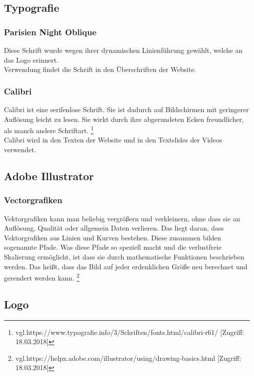 \subsection{Typografie}
\subsubsection{Parisien Night Oblique}
Diese Schrift wurde wegen ihrer dynamischen Linienführung gewählt, welche an das Logo erinnert.
\\
Verwendung findet die Schrift in den Überschriften der Website.

\subsubsection{Calibri}
Calibri ist eine serifenlose Schrift. Sie ist dadurch auf Bildschirmen mit geringerer Auflösung leicht zu lesen. Sie wirkt durch ihre abgerundeten Ecken freundlicher, als manch andere Schriftart. \footnote{\label{} vgl.https://www.typografie.info/3/Schriften/fonts.html/calibri-r61/ [Zugriff: 18.03.2018]}
\\
Calibri wird in den Texten der Website und in den Textslides der Videos verwendet.

\subsection{Adobe Illustrator}
\subsubsection{Vectorgrafiken}
Vektorgrafiken kann man beliebig vergrößern und verkleinern, ohne dass sie an Auflösung, Qualität oder allgemein Daten verlieren. Das liegt daran, dass Vektorgrafiken aus Linien und Kurven bestehen. Diese zusammen bilden sogenannte Pfade. Was diese Pfade so speziell macht und die verlustfreie Skalierung ermöglicht, ist dass sie durch mathematische Funktionen beschrieben werden. Das heißt, dass das Bild auf jeder erdenklichen Größe neu berechnet und gerendert werden kann.
\footnote{\label{} vgl.https://helpx.adobe.com/illustrator/using/drawing-basics.html [Zugriff: 18.03.2018]}

\subsection{Logo}
